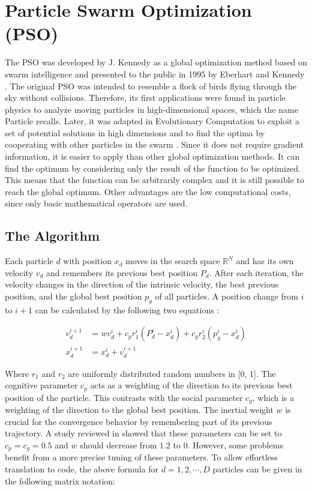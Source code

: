 \documentclass[
  oneside]{book}
\begin{document}
\hypertarget{particle-swarm-optimization-pso}{%
\chapter{Particle Swarm Optimization (PSO)}\label{particle-swarm-optimization-pso}}

The PSO was developed by J. Kennedy as a global optimization method based on swarm intelligence and presented to the public in 1995 by Eberhart and Kennedy \citep{KeEb1995}. The original PSO was intended to resemble a flock of birds flying through the sky without collisions. Therefore, its first applications were found in particle physics to analyze moving particles in high-dimensional spaces, which the name Particle recalls. Later, it was adapted in Evolutionary Computation to exploit a set of potential solutions in high dimensions and to find the optima by cooperating with other particles in the swarm \citep{PaVr2002}. Since it does not require gradient information, it is easier to apply than other global optimization methods. It can find the optimum by considering only the result of the function to be optimized. This means that the function can be arbitrarily complex and it is still possible to reach the global optimum. Other advantages are the low computational costs, since only basic mathematical operators are used.

\hypertarget{the-algorithm}{%
\section{The Algorithm}\label{the-algorithm}}

Each particle \(d\) with position \(x_d\) moves in the search space \(\mathbb{R}^N\) and has its own velocity \(v_d\) and remembers its previous best position \(P_d\). After each iteration, the velocity changes in the direction of the intrinsic velocity, the best previous position, and the global best position \(p_g\) of all particles. A position change from \(i\) to \(i+1\) can be calculated by the following two equations \citep{PaVr2002}:

\begin{align*}
  v_d^{i+1} &= wv_d^{i} + c_p r_1^i (P_d^i - x_d^i) + c_g r_2^i (p_g^i - x_d^i) \\
  x_d^{i+1} &= x_d^i + v_d^{i+1}
\end{align*}

Where \(r_1\) and \(r_2\) are uniformly distributed random numbers in {[}0, 1{]}. The cognitive parameter \(c_p\) acts as a weighting of the direction to its previous best position of the particle. This contrasts with the social parameter \(c_g\), which is a weighting of the direction to the global best position. The inertial weight \(w\) is crucial for the convergence behavior by remembering part of its previous trajectory. A study reviewed in \citep{PaVr2002} showed that these parameters can be set to \(c_p=c_g=0.5\) and \(w\) should decrease from \(1.2\) to \(0\). However, some problems benefit from a more precise tuning of these parameters. To allow effortless translation to code, the above formula for \(d = 1, 2, \cdots, D\) particles can be given in the following matrix notation:
\end{document}
